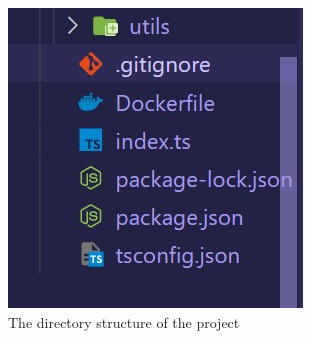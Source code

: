 \documentclass[oneside,12pt]{Classes/VTU}
\begin{document}
	\begin{figure}[ht!]
		\includegraphics[scale=0.7]{d4.jpg}
		\centering
		\caption{The directory structure of the project}
		\label{fig:direc}
	\end{figure}
\end{document}
